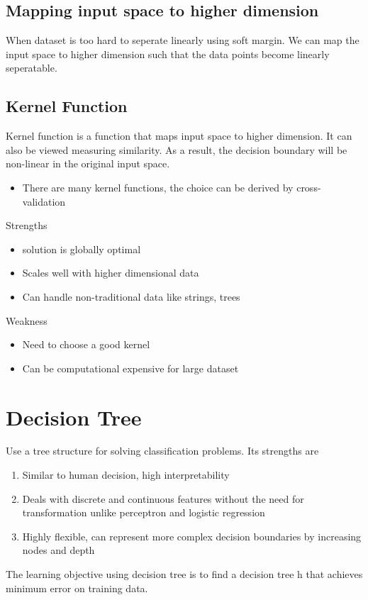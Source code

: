 \documentclass[11pt]{article}
\begin{document}
\subsection{Mapping input space to higher dimension}
\label{sec:orga60f2a7}
When dataset is too hard to seperate linearly using soft margin. We can map the input space to higher dimension such that the data points become linearly seperatable.
\subsection{Kernel Function}
\label{sec:org264db9a}
Kernel function is a function that maps input space to higher dimension. It can also be viewed measuring similarity. As a result, the decision boundary will be non-linear in the original input space.
\begin{itemize}
\item There are many kernel functions, the choice can be derived by cross-validation
\end{itemize}
Strengths
\begin{itemize}
\item solution is globally optimal
\item Scales well with higher dimensional data
\item Can handle non-traditional data like strings, trees
\end{itemize}
Weakness
\begin{itemize}
\item Need to choose a good kernel
\item Can be computational expensive for large dataset
\end{itemize}

\section{Decision Tree}
\label{sec:org012d9e2}
Use a tree structure for solving classification problems. Its strengths are 
\begin{enumerate}
\item Similar to human decision, high interpretability
\item Deals with discrete and continuous features without the need for transformation unlike perceptron and logistic regression
\item Highly flexible, can represent more complex decision boundaries by increasing nodes and depth
\end{enumerate}
The learning objective using decision tree is to find a decision tree h that achieves minimum error on training data. 
\end{document}

